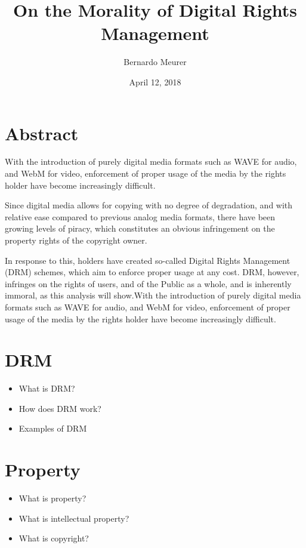 \documentclass[12pt,letterpaper]{article}
\title{On the Morality of Digital Rights Management}
\author{Bernardo Meurer}
\date{April 12, 2018}
\begin{document}
\maketitle
\newpage
\section{Abstract}
    With the introduction of purely digital media formats such as WAVE for audio, and WebM for video, enforcement of proper usage of the media by the rights holder have become increasingly difficult.

    Since digital media allows for copying with no degree of degradation, and with relative ease compared to previous analog media formats, there have been growing levels of piracy, which constitutes an obvious infringement on the property rights of the copyright owner.

    In response to this, holders have created so-called Digital Rights Management (DRM) schemes, which aim to enforce proper usage at any cost. DRM, however, infringes on the rights of users, and of the Public as a whole, and is inherently immoral, as this analysis will show.With the introduction of purely digital media formats such as WAVE for audio, and WebM for video, enforcement of proper usage of the media by the rights holder have become increasingly difficult.
\section{DRM}
\begin{itemize}
    \item What is DRM?\autocite{favale-2014}
    \item How does DRM work?\autocite{goldstein-1996}
    \item Examples of DRM
\end{itemize}
\section{Property}
\begin{itemize}
    \item What is property?\autocite{locke-1988}
    \item What is intellectual property?\autocite{hegel-1991}
    \item What is copyright?\autocite{wortley-1710}
\end{itemize}
\end{document}
